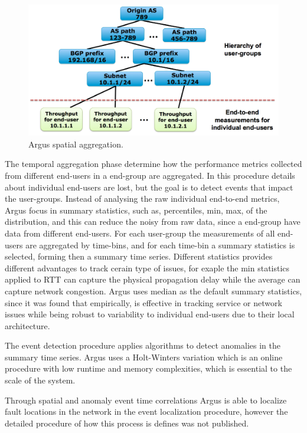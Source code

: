 \begin{figure}[H]
    \centering
    \includegraphics[width=1.0\textwidth]{./figures/literature_review/argus_spatial_aggregation.png}
    \caption{Argus spatial aggregation.}
    \label{fig:argus_spatial_aggregation}
\end{figure}%

The temporal aggregation phase determine how the performance metrics collected
from different end-users in a end-group are aggregated. In this procedure
details about individual end-users are lost, but the goal is to detect events
that impact the user-groups. Instead of analysing the raw individual end-to-end
metrics, Argus focus in summary statistics, such as, percentiles, min, max, of
the distribution, and this can reduce the noisy from raw data, since a
end-group have data from different end-users. For each user-group the
measurements of all end-users are aggregated by time-bins, and for each
time-bin a summary statistics is selected, forming then a summary time series.
Different statistics provides different advantages to track cerain type of
issues, for exaple the min statistics applied to RTT can capture the physical
propagation delay while the average can capture network congestion. Argus uses
median as the default summary statistics, since it was found that empirically,
is effective in tracking service or network issues while being robust to
variability to individual end-users due to their local architecture.

The event detection procedure applies algorithms to detect anomalies in the
summary time series. Argus uses a Holt-Winters variation which is an online
procedure with low runtime and memory complexities, which is essential to the
scale of the system.

Through spatial and anomaly event time correlations Argus is able to localize
fault locations in the network in the event localization procedure, however the
detailed procedure of how this
process is defines was not published.

